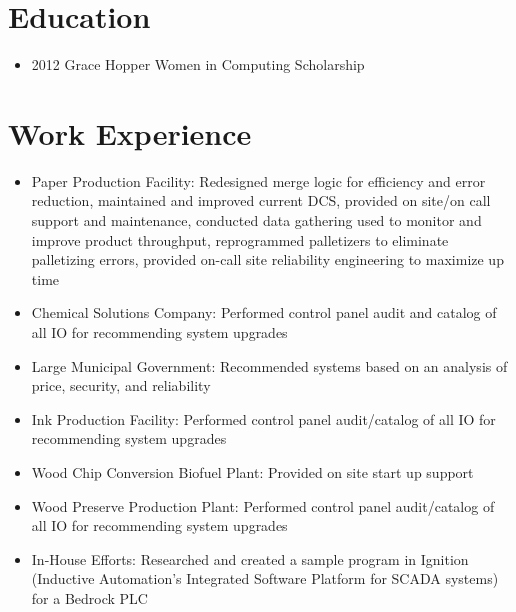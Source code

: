 \documentclass[11pt,letterpaper,sans]{moderncv}        %
\begin{document}
\makecvtitle

\vspace{-15mm}

\section{Education}
\vspace{-1mm}
\begin{itemize}
\item 2012 Grace Hopper Women in Computing Scholarship
\end{itemize}
\vspace{1mm}

\vspace{-1mm}

\section{Work Experience}

\begin{itemize}
\item Paper Production Facility: Redesigned merge logic for efficiency and error reduction, maintained and improved current DCS, provided on site/on call support and maintenance, conducted data gathering used to monitor and improve product throughput, reprogrammed palletizers to eliminate palletizing errors, provided on-call site reliability engineering to maximize up time
\item Chemical Solutions Company: Performed control panel audit and catalog of all IO for recommending system upgrades
\item Large Municipal Government: Recommended systems based on an analysis of price, security, and reliability
\item Ink Production Facility: Performed control panel audit/catalog of all IO for recommending system upgrades
\item Wood Chip Conversion Biofuel Plant: Provided on site start up support
\item Wood Preserve Production Plant: Performed control panel audit/catalog of all IO for recommending system upgrades
\item In-House Efforts: Researched and created a sample program in Ignition (Inductive Automation’s Integrated Software Platform for SCADA systems) for a Bedrock PLC
\end{itemize}
\end{document}
